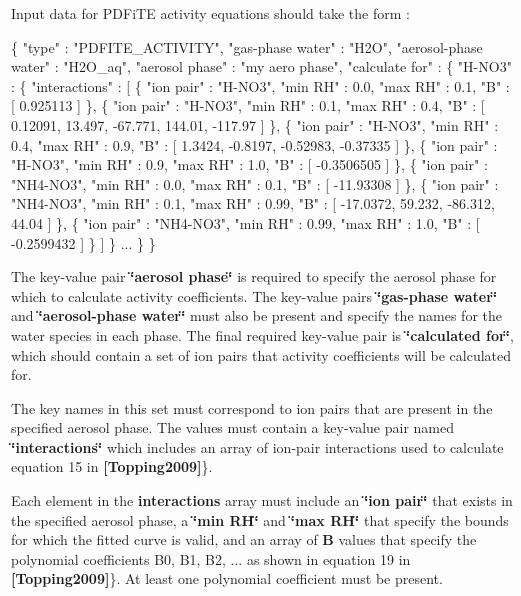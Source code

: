 Input data for P\+D\+Fi\+TE activity equations should take the form \+: 
\begin{DoxyCode}
\{
  "type" : "PDFITE\_ACTIVITY",
  "gas-phase water" : "H2O",
  "aerosol-phase water" : "H2O\_aq",
  "aerosol phase" : "my aero phase",
  "calculate for" : \{
    "H-NO3" : \{
      "interactions" : [
        \{
          "ion pair" : "H-NO3",
          "min RH" : 0.0,
          "max RH" : 0.1,
          "B" : [ 0.925113 ]
        \},
        \{
          "ion pair" : "H-NO3",
          "min RH" : 0.1,
          "max RH" : 0.4,
          "B" : [ 0.12091, 13.497, -67.771, 144.01, -117.97 ]
        \},
        \{
          "ion pair" : "H-NO3",
          "min RH" : 0.4,
          "max RH" : 0.9,
          "B" : [ 1.3424, -0.8197, -0.52983, -0.37335 ]
        \},
        \{
          "ion pair" : "H-NO3",
          "min RH" : 0.9,
          "max RH" : 1.0,
          "B" : [ -0.3506505 ] 
        \},
        \{
          "ion pair" : "NH4-NO3",
          "min RH" : 0.0,
          "max RH" : 0.1,
          "B" : [ -11.93308 ]
        \},
        \{
          "ion pair" : "NH4-NO3",
          "min RH" : 0.1,
          "max RH" : 0.99,
          "B" : [ -17.0372, 59.232, -86.312, 44.04 ]
        \},
        \{
          "ion pair" : "NH4-NO3",
          "min RH" : 0.99,
          "max RH" : 1.0,
          "B" : [ -0.2599432 ] 
        \}
      ]
    \}
    ...
  \}
\}
\end{DoxyCode}
 The key-\/value pair {\bfseries \char`\"{}aerosol phase\char`\"{}} is required to specify the aerosol phase for which to calculate activity coefficients. The key-\/value pairs {\bfseries \char`\"{}gas-\/phase water\char`\"{}} and {\bfseries \char`\"{}aerosol-\/phase water\char`\"{}} must also be present and specify the names for the water species in each phase. The final required key-\/value pair is {\bfseries \char`\"{}calculated for\char`\"{}}, which should contain a set of ion pairs that activity coefficients will be calculated for.

The key names in this set must correspond to ion pairs that are present in the specified aerosol phase. The values must contain a key-\/value pair named {\bfseries \char`\"{}interactions\char`\"{}} which includes an array of ion-\/pair interactions used to calculate equation 15 in {\bfseries [Topping2009]}\}.

Each element in the {\bfseries interactions} array must include an {\bfseries \char`\"{}ion pair\char`\"{}} that exists in the specified aerosol phase, a {\bfseries \char`\"{}min R\+H\char`\"{}} and {\bfseries \char`\"{}max R\+H\char`\"{}} that specify the bounds for which the fitted curve is valid, and an array of {\bfseries B} values that specify the polynomial coefficients B0, B1, B2, ... as shown in equation 19 in {\bfseries [Topping2009]}\}. At least one polynomial coefficient must be present.

